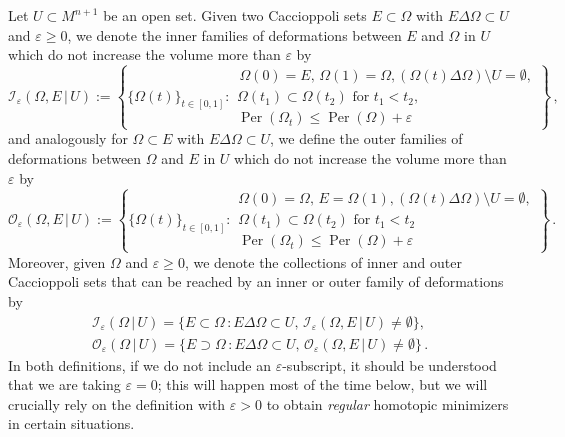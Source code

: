 \documentclass[12pt,twoside]{amsart}
\numberwithin{equation}{section}
\renewcommand{\leq}{\leqslant}
\renewcommand{\geq}{\geqslant}
\newcommand{\cI}{\mathcal I}
\newcommand{\cO}{\mathcal O}
\DeclareMathOperator{\Per}{Per}
\newcommand{\eps}{\varepsilon}
\begin{document}
Let $U \subset M^{n+1}$ be an open set. Given two Caccioppoli sets $E\subset \Omega$ with $E \Delta \Omega \subset U$ and $\eps \geq 0$, we denote the inner families of deformations between $E$ and $\Omega$ in $U$ which do not increase the volume more than $\eps$ by
\[
\cI_\eps(\Omega, E\,|\,U):=\left\{ \{\Omega(t)\}_{t \in [0,1]} :  \begin{gathered} \, \Omega(0) = E,\, \Omega(1) = \Omega, (\Omega(t)\Delta \Omega) \setminus U =\emptyset,\\ \Omega(t_1) \subset \Omega(t_2) \text{ for } t_1 < t_2, \\
\Per(\Omega_t)  \leq \Per(\Omega) + \eps\ \end{gathered}   \right\}\,, 
\]
and analogously for $\Omega\subset E$ with $E \Delta \Omega \subset U$, we define the outer families of deformations between $\Omega$ and $E$ in $U$ which do not increase the volume more than $\eps$ by
\[
\cO_\eps(\Omega, E\,|\, U):=\left\{\{\Omega(t)\}_{t \in [0,1]}:\begin{gathered} \Omega(0) =\Omega,\, E = \Omega(1), (\Omega(t)\Delta \Omega) \setminus U =\emptyset,\\ \Omega(t_1) \subset \Omega(t_2) \text{ for } t_1 < t_2  \\ \Per(\Omega_t) \leq \Per(\Omega) + \eps\end{gathered} \right\}\,. 
\]
Moreover, given $\Omega$ and $\eps\geq 0$, we denote the collections of inner and outer Caccioppoli sets that can be reached by an inner or outer family of deformations by
\begin{gather*}
    \cI_\eps(\Omega\,|\, U)=\{E\subset \Omega\,: E \Delta \Omega \subset U,\, \cI_\eps(\Omega, E\,|\,U)\neq \emptyset\},\\
    \cO_\eps(\Omega\,|\, U)=\{E\supset \Omega\,: E \Delta \Omega \subset U, \, \cO_\eps(\Omega, E\,|\,U)\neq \emptyset\}\,.
\end{gather*}
In both definitions, if we do not include an $\eps$-subscript, it should be understood that we are taking $\eps=0$; this will happen most of the time below, but we will crucially rely on the definition with $\eps>0$ to obtain \emph{regular} homotopic minimizers in certain situations. 
\end{document}
